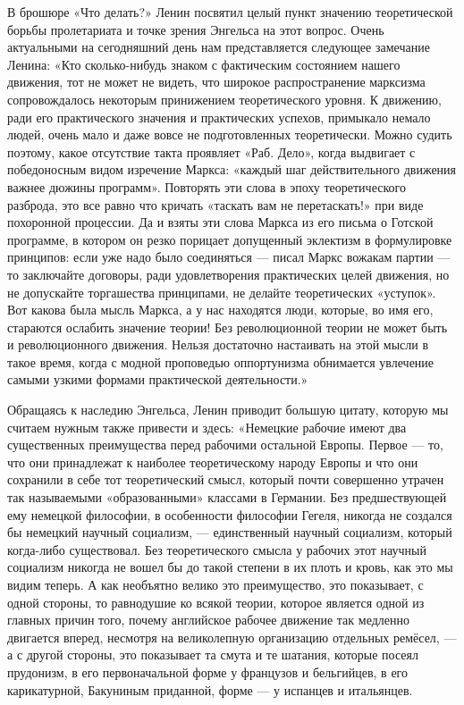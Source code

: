 \documentclass[../main]{subfiles}
\begin{document}
В брошюре «Что делать?» Ленин посвятил целый пункт значению теоретической борьбы пролетариата и точке зрения Энгельса на этот вопрос. Очень актуальными на сегодняшний день нам представляется следующее замечание Ленина: «Кто сколько-нибудь знаком с фактическим состоянием нашего движения, тот не может не видеть, что широкое распространение марксизма сопровождалось некоторым принижением теоретического уровня. К движению, ради его практического значения и практических успехов, примыкало немало людей, очень мало и даже вовсе не подготовленных теоретически. Можно судить поэтому, какое отсутствие такта проявляет «Раб. Дело», когда выдвигает с победоносным видом изречение Маркса: «каждый шаг действительного движения важнее дюжины программ». Повторять эти слова в эпоху теоретического разброда, это все равно что кричать «таскать вам не перетаскать!» при виде похоронной процессии. Да и взяты эти слова Маркса из его письма о Готской программе, в котором он резко порицает допущенный эклектизм в формулировке принципов: если уже надо было соединяться — писал Маркс вожакам партии — то заключайте договоры, ради удовлетворения практических целей движения, но не допускайте торгашества принципами, не делайте теоретических «уступок». Вот какова была мысль Маркса, а у нас находятся люди, которые, во имя его, стараются ослабить значение теории! Без революционной теории не может быть и революционного движения. Нельзя достаточно настаивать на этой мысли в такое время, когда с модной проповедью оппортунизма обнимается увлечение самыми узкими формами практической деятельности.»

Обращаясь к наследию Энгельса, Ленин приводит большую цитату, которую мы считаем нужным также привести и здесь: «Немецкие рабочие имеют два существенных преимущества перед рабочими остальной Европы. Первое — то, что они принадлежат к наиболее теоретическому народу Европы и что они сохранили в себе тот теоретический смысл, который почти совершенно утрачен так называемыми «образованными» классами в Германии. Без предшествующей ему немецкой философии, в особенности философии Гегеля, никогда не создался бы немецкий научный социализм, — единственный научный социализм, который когда-либо существовал. Без теоретического смысла у рабочих этот научный социализм никогда не вошел бы до такой степени в их плоть и кровь, как это мы видим теперь. А как необъятно велико это преимущество, это показывает, с одной стороны, то равнодушие ко всякой теории, которое является одной из главных причин того, почему английское рабочее движение так медленно двигается вперед, несмотря на великолепную организацию отдельных ремёсел, — а с другой стороны, это показывает та смута и те шатания, которые посеял прудонизм, в его первоначальной форме у французов и бельгийцев, в его карикатурной, Бакуниным приданной, форме — у испанцев и итальянцев.
\end{document}
